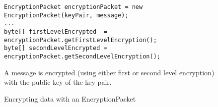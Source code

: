 \begin{figure}[H]
  \centering
  \begin{verbatim}
EncryptionPacket encryptionPacket = new EncryptionPacket(keyPair, message);
...
byte[] firstLevelEncrypted  = encryptionPacket.getFirstLevelEncryption();
byte[] secondLevelEncrypted = encryptionPacket.getSecondLevelEncryption();
  \end{verbatim}
  \caption{
    Encrypting data with an EncryptionPacket
  }{
  	A message is encrypted (using either first or second level encryption) with the public key of the key pair.
  }
  \label{code:encryption_packet_encryption}
\end{figure}
